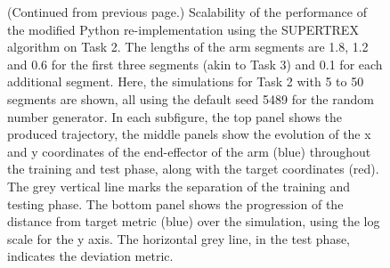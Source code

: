 \begin{figure}
    \caption{(Continued from previous page.) Scalability of the performance of the modified Python re-implementation using the SUPERTREX algorithm on Task 2. The lengths of the arm segments are 1.8, 1.2 and 0.6 for the first three segments (akin to Task 3) and 0.1 for each additional segment. Here, the simulations for Task 2 with 5 to 50 segments are shown, all using the default seed 5489 for the random number generator. In each subfigure, the top panel shows the produced trajectory, the middle panels show the evolution of the x and y coordinates of the end-effector of the arm (blue) throughout the training and test phase, along with the target coordinates (red). The grey vertical line marks the separation of the training and testing phase. The bottom panel shows the progression of the distance from target metric (blue) over the simulation, using the log scale for the y axis. The horizontal grey line, in the test phase, indicates the deviation metric.}
    \label{Fig:Scalability_Task2_cont}

\end{figure}
